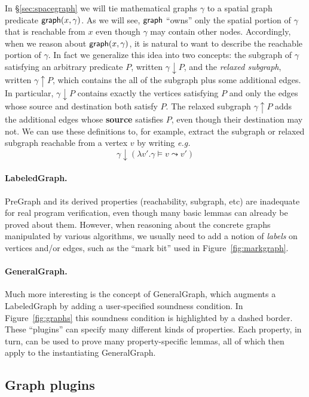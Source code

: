 In \S\ref{sec:spacegraph} we will tie mathematical graphs $\gamma$ to a spatial graph predicate
$\mathsf{graph}(x, \gamma)$.   As we will see, $\mathsf{graph}$ ``owns'' only the
spatial portion of $\gamma$ that is reachable
from $x$ even though $\gamma$ may contain other nodes.  Accordingly, when we reason about
$\mathsf{graph}(x, \gamma)$, it is natural to want to describe the
reachable portion of $\gamma$.  In fact we generalize this
idea into two concepts: the subgraph of $\gamma$ satisfying
an arbitrary predicate $P$, written $\gamma \!\downarrow\! P$, and the \emph{relaxed subgraph}, written $\gamma \!\uparrow\! P$, which contains the all of the subgraph plus some additional edges.  In particular, $\gamma \!\downarrow\! P$ contains exactly the vertices satisfying $P$ and only the edges whose source and destination both satisfy $P$.  The relaxed subgraph $\gamma \!\uparrow\! P$ adds the additional edges whose \textbf{source} satisfies $P$, even though their destination may not.
We can use these definitions to, for example, extract the subgraph or relaxed subgraph reachable from a vertex $v$ by writing \emph{e.g.}
\[
\gamma \!\downarrow\! (\lambda v'. \gamma\models v \leadsto v')
\]

\paragraph{LabeledGraph.} 
PreGraph and its derived properties (reachability, subgraph, etc) are
inadequate for real program verification, even though many basic lemmas can already be proved about them.
However, when reasoning about the concrete graphs manipulated by various algorithms, 
we usually need to add a notion of \emph{labels} on vertices and/or edges, such as
the ``mark bit'' used in Figure~\ref{fig:markgraph}.

\paragraph{GeneralGraph.}
Much more interesting is the concept of GeneralGraph, which augments a LabeledGraph by adding a user-specified soundness condition.  In Figure~\ref{fig:graphs} this soundness condition is highlighted by a dashed border.  These ``plugins'' can specify many different kinds of properties.  Each property, in turn, can be used to prove many property-specific lemmas, all of which then apply to the instantiating GeneralGraph.

\subsection{Graph plugins}

